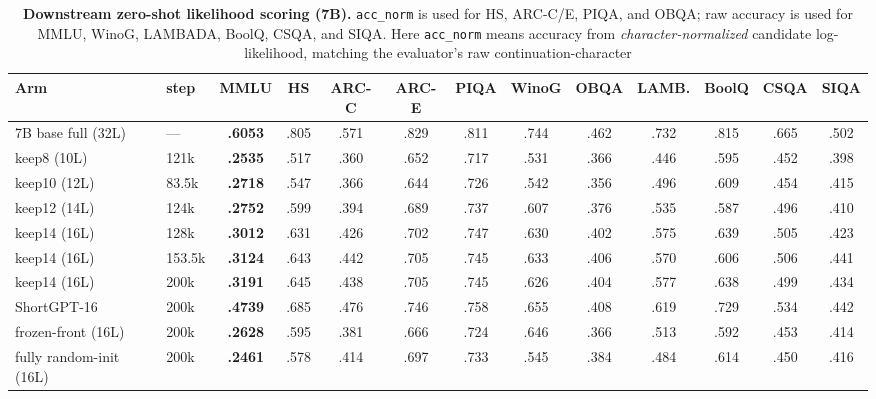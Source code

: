 \begin{table}[t]
\centering
\scriptsize
\setlength{\tabcolsep}{2.2pt}
\begin{tabular}{@{}llccccccccccc@{}}
\toprule
\textbf{Arm} & \textbf{step} & \textbf{MMLU} & \textbf{HS} &
\textbf{ARC-C} & \textbf{ARC-E} & \textbf{PIQA} & \textbf{WinoG} &
\textbf{OBQA} & \textbf{LAMB.} & \textbf{BoolQ} & \textbf{CSQA} &
\textbf{SIQA} \\
\midrule
7B base full (32L)       & ---    & \textbf{.6053} & .805 & .571 & .829 & .811 & .744 & .462 & .732 & .815 & .665 & .502 \\
keep8 (10L)              & 121k   & \textbf{.2535} & .517 & .360 & .652 & .717 & .531 & .366 & .446 & .595 & .452 & .398 \\
keep10 (12L)             & 83.5k  & \textbf{.2718} & .547 & .366 & .644 & .726 & .542 & .356 & .496 & .609 & .454 & .415 \\
keep12 (14L)             & 124k   & \textbf{.2752} & .599 & .394 & .689 & .737 & .607 & .376 & .535 & .587 & .496 & .410 \\
keep14 (16L)             & 128k   & \textbf{.3012} & .631 & .426 & .702 & .747 & .630 & .402 & .575 & .639 & .505 & .423 \\
keep14 (16L)             & 153.5k & \textbf{.3124} & .643 & .442 & .705 & .745 & .633 & .406 & .570 & .606 & .506 & .441 \\
keep14 (16L)             & 200k   & \textbf{.3191} & .645 & .438 & .705 & .745 & .626 & .404 & .577 & .638 & .499 & .434 \\
ShortGPT-16              & 200k   & \textbf{.4739} & .685 & .476 & .746 & .758 & .655 & .408 & .619 & .729 & .534 & .442 \\
frozen-front (16L)       & 200k   & \textbf{.2628} & .595 & .381 & .666 & .724 & .646 & .366 & .513 & .592 & .453 & .414 \\
fully random-init (16L)  & 200k   & \textbf{.2461} & .578 & .414 & .697 & .733 & .545 & .384 & .484 & .614 & .450 & .416 \\
\bottomrule
\end{tabular}
\caption{\textbf{Downstream zero-shot likelihood scoring (7B).}
\texttt{acc\_norm} is used for HS, ARC-C/E, PIQA, and OBQA; raw accuracy is
used for MMLU, WinoG, LAMBADA, BoolQ, CSQA, and SIQA. Here
\texttt{acc\_norm} means accuracy from \emph{character-normalized} candidate
log-likelihood, matching the evaluator's raw continuation-character
}
\end{table}
